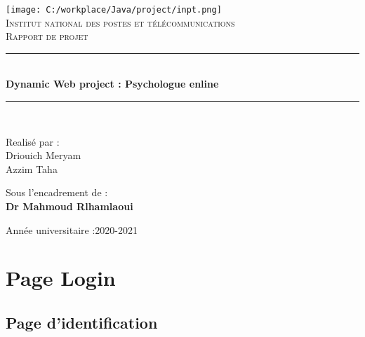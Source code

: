 \documentclass[12]{article}
\newcommand{\HRule}{\rule{\linewidth}{0.5mm}}
\begin{document}
\onehalfspacing


\begin{titlepage}
  \begin{sffamily}
  \begin{center}

    \texttt{[image: C:/workplace/Java/project/inpt.png]}~\\[1.5cm]

    \textsc{\LARGE Institut national des postes et télécommunications}\\[2cm]

    \textsc{\Large Rapport de projet}\\[1.5cm]

    \HRule \\[0.4cm]
    { \huge \bfseries  Dynamic Web project :
    Psychologue enline \\[0.1cm] }

    \HRule \\[2cm]


    \begin{minipage}{0.4\textwidth}
      \begin{flushleft} \large
       Realisé par :\\
        Driouich Meryam\\
        Azzim Taha\\
      \end{flushleft}
    \end{minipage}
    \begin{minipage}{0.4\textwidth}
      \begin{flushright} \large
       Sous l'encadrement de :\\ \textbf{Dr Mahmoud Rlhamlaoui}
      \end{flushright}
    \end{minipage}

    \vfill

    {\large  Année universitaire :2020-2021}

  \end{center}
  \end{sffamily}
\end{titlepage}
\tableofcontents

\newpage

\section{Page Login}
\subsection{Page d'identification}
\indent
\end{document}
